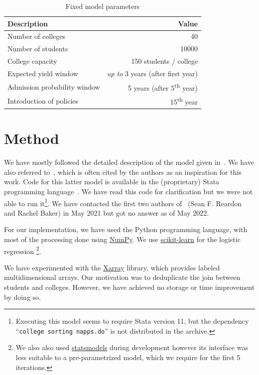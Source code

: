 \begin{table}[!ht]
    \centering
    \begin{tabular}{l r} \toprule
        \textbf{Description} & \textbf{Value} \\ \midrule
        Number of colleges & 40 \\
        Number of students & 10000 \\

        College capacity & 150 students / college \\
        Expected yield window & \emph{up to} 3 years (after first year) \\
        Admission probability window & 5 years (after 5\textsuperscript{th} year) \\
        Introduction of policies & 15\textsuperscript{th} year \\ \bottomrule
    \end{tabular}
    \caption{Fixed model parameters}
    \label{tab:const}
\end{table}


\section{Method}

We have mostly followed the detailed description of the model given in~\cite[Appendix~C]{reardon2018levels}.
We have also referred to~\cite{reardon2016agent}, which is often cited by the authors as an inspiration for this work.
Code for this latter model is available in the (proprietary) Stata programming language~\cite{reardon2016stata}.
We have read this code for clarification but we were not able to run it\footnote{Executing this model seems to require Stata version 11, but the dependency ``\texttt{college sorting napps.do}'' is not distributed in the archive.}.
We have contacted the first two authors of~\cite{reardon2018levels} (Sean F. Reardon and Rachel Baker) in May 2021 but got no answer as of May 2022.

For our implementation, we have used the Python programming language, with most of the processing done using \href{https://numpy.org/}{NumPy}.
We use \href{https://scikit-learn.org/}{scikit-learn} for the logistic regression%
\footnote{We also also used \href{https://www.statsmodels.org/}{statsmodels} during development however its interface was less suitable to a pre-parametrized model, which we require for the first 5 iterations.}.

We have experimented with the \href{https://xarray.dev/}{Xarray} library, which provides labeled multidimensional arrays.
Our motivation was to deduplicate the join between students and colleges.
However, we have achieved no storage or time improvement by doing so.


